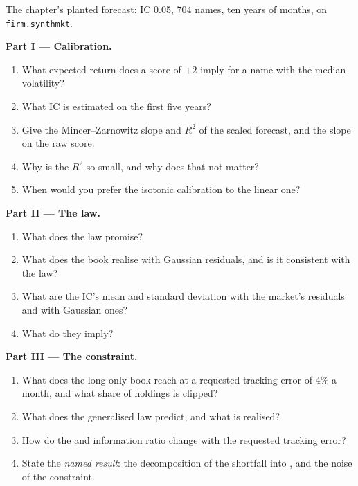 \begin{problem}\label{pb:rs:from-signal-to-forecast:1}
The chapter's planted forecast: IC 0.05, 704 names, ten years of months, on \texttt{firm.synthmkt}.

\medskip\noindent\textbf{Part I --- Calibration.}
\begin{enumerate}
\item What expected return does a score of $+2$ imply for a name with the median volatility?
\item What IC is estimated on the first five years?
\item Give the Mincer--Zarnowitz slope and $R^2$ of the scaled forecast, and the slope on the raw score.
\item Why is the $R^2$ so small, and why does that not matter?
\item When would you prefer the isotonic calibration to the linear one?
\end{enumerate}

\medskip\noindent\textbf{Part II --- The law.}
\begin{enumerate}[resume]
\item What does the law promise?
\item What does the book realise with Gaussian residuals, and is it consistent with the law?
\item What are the IC's mean and standard deviation with the market's residuals and with Gaussian ones?
\item What  do they imply?
\end{enumerate}

\medskip\noindent\textbf{Part III --- The constraint.}
\begin{enumerate}[resume]
\item What  does the long-only book reach at a requested tracking error of 4\% a month, and what share of holdings is clipped?
\item What does the generalised law predict, and what is realised?
\item How do the  and information ratio change with the requested tracking error?
\item State the \emph{named result}: the decomposition of the shortfall into ,  and the noise of the constraint.
\end{enumerate}


\end{problem}
